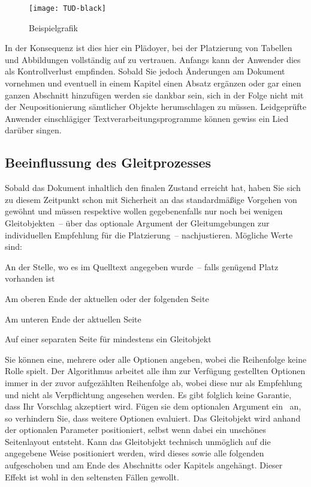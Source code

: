 \documentclass[%
  english,ngerman,%
  cdgeometry=no,DIV=12,automark,%
]{tudscrartcl}
\begin{document}
\begin{Trunk}
\begin{figure}
\centering
\texttt{[image: TUD-black]}
\caption{Beispielgrafik}\label{fig:example}
\end{figure}

\end{Trunk}
\InputCode\noindent
%
In der Konsequenz ist dies hier ein Plädoyer, bei der Platzierung von Tabellen 
und Abbildungen vollständig auf  zu vertrauen. Anfangs kann der 
Anwender dies als Kontrollverlust empfinden. Sobald Sie jedoch Änderungen am 
Dokument vornehmen und eventuell in einem Kapitel einen Absatz ergänzen oder 
gar einen ganzen Abschnitt hinzufügen werden sie dankbar sein, sich in der 
Folge nicht mit der Neupositionierung sämtlicher Objekte herumschlagen zu 
müssen. Leidgeprüfte Anwender einschlägiger Textverarbeitungsprogramme können 
gewiss ein Lied darüber singen.



\subsection{Beeinflussung des Gleitprozesses}
Sobald das Dokument inhaltlich den finalen Zustand erreicht hat, haben Sie sich 
zu diesem Zeitpunkt schon mit Sicherheit an das standardmäßige Vorgehen von 
 gewöhnt und müssen respektive wollen gegebenenfalls nur noch bei 
wenigen Gleitobjekten~-- über das optionale Argument der Gleitumgebungen zur
individuellen Empfehlung für die Platzierung~-- nachjustieren. Mögliche Werte 
sind:
%
\begin{description}[labelindent=\parindent,leftmargin=*,style=nextline]
\item[\POParameter{h} (here)]
  An der Stelle, wo es im Quelltext angegeben wurde~-- falls genügend Platz 
  vorhanden ist
\item[\POParameter{t} (top)]
  Am oberen Ende der aktuellen oder der folgenden Seite
\item[\POParameter{b} (bottom)]
  Am unteren Ende der aktuellen Seite
\item[\POParameter{p} (page)]
  Auf einer separaten Seite für mindestens ein Gleitobjekt
\end{description}
%
Sie können eine, mehrere oder alle Optionen angeben, wobei die Reihenfolge 
keine Rolle spielt. Der Algorithmus arbeitet alle ihm zur Verfügung gestellten 
Optionen immer in der zuvor aufgezählten Reihenfolge ab, wobei diese nur als 
Empfehlung und nicht als Verpflichtung angesehen werden. Es gibt folglich keine 
Garantie, dass Ihr Vorschlag akzeptiert wird. Fügen sie dem optionalen Argument 
ein~\PValue{!} an, so verhindern Sie, dass  weitere Optionen 
evaluiert. Das Gleitobjekt wird anhand der optionalen Parameter positioniert, 
selbst wenn dabei ein unschönes Seitenlayout entsteht. Kann das Gleitobjekt 
technisch unmöglich auf die angegebene Weise positioniert werden, wird dieses 
sowie alle folgenden aufgeschoben und am Ende des Abschnitts oder Kapitels 
angehängt. Dieser Effekt ist wohl in den seltensten Fällen gewollt. 
\end{document}

